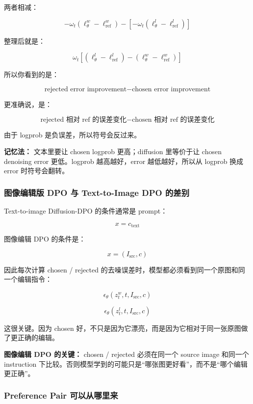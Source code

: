 两者相减：

\[
-
\omega_t
\left(
\ell_\theta^w-\ell_\text{ref}^w
\right)
-
\left[
-
\omega_t
\left(
\ell_\theta^l-\ell_\text{ref}^l
\right)
\right]
\]

整理后就是：

\[
\omega_t
\left[
\left(
\ell_\theta^l-\ell_\text{ref}^l
\right)
-
\left(
\ell_\theta^w-\ell_\text{ref}^w
\right)
\right]
\]

所以你看到的是：

\[
\text{rejected error improvement}
-
\text{chosen error improvement}
\]

更准确说，是：

\[
\text{rejected 相对 ref 的误差变化}
-
\text{chosen 相对 ref 的误差变化}
\]

由于 logprob 是负误差，所以符号会反过来。

\begin{intubox}
\textbf{记忆法：} 文本里要让 chosen logprob 更高；diffusion 里等价于让 chosen denoising error 更低。logprob 越高越好，error 越低越好，所以从 logprob 换成 error 时符号会翻转。
\end{intubox}

\subsubsection{图像编辑版 DPO 与 Text-to-Image DPO 的差别}

Text-to-image Diffusion-DPO 的条件通常是 prompt：

\[
x=c_\text{text}
\]

图像编辑 DPO 的条件是：

\[
x=(I_\text{src},c)
\]

因此每次计算 chosen / rejected 的去噪误差时，模型都必须看到同一个原图和同一个编辑指令：

\[
\epsilon_\theta(z_t^w,t,I_\text{src},c)
\]

\[
\epsilon_\theta(z_t^l,t,I_\text{src},c)
\]

这很关键。因为 chosen 好，不只是因为它漂亮，而是因为它相对于同一张原图做了更正确的编辑。

\begin{warnbox}
\textbf{图像编辑 DPO 的关键：} chosen / rejected 必须在同一个 source image 和同一个 instruction 下比较。否则模型学到的可能只是“哪张图更好看”，而不是“哪个编辑更正确”。
\end{warnbox}

\subsubsection{Preference Pair 可以从哪里来}

